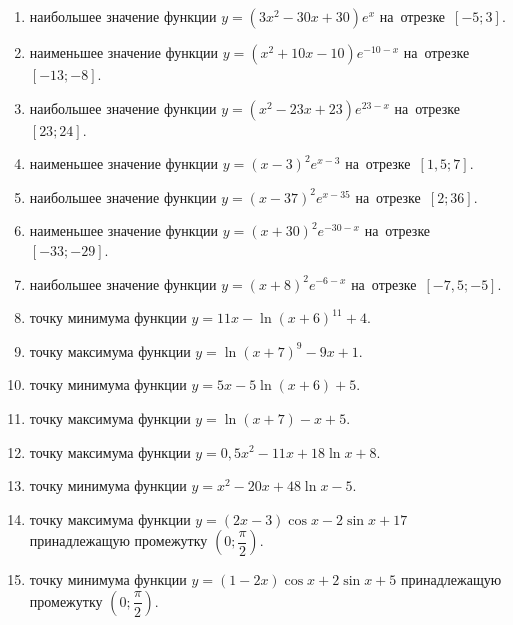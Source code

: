 \documentclass[a4paper,10pt]{article}
\begin{document}
\begin{enumerate}
\item {} наибольшее значение функции $y=\left(3x^2 -30x +30\right)e^{x}$ на~отрезке~$\left[-5;3\right]$.

\item {} наименьшее значение функции $y=\left(x^2 +10x -10\right)e^{-10-x}$ на~отрезке~$\left[-13;-8\right]$.

\item {} наибольшее значение функции $y=\left(x^2 -23x +23\right)e^{23-x}$ на~отрезке~$\left[23;24\right]$.

\item {} наименьшее значение функции $y=\left(x-3\right)^2e^{x-3}$ на~отрезке~$\left[1,5;7\right]$.

\item {} наибольшее значение функции $y=\left(x-37\right)^2e^{x-35}$ на~отрезке~$\left[2;36\right]$.

\item {} наименьшее значение функции $y=\left(x+30\right)^2e^{-30-x}$ на~отрезке~$\left[-33;-29\right]$.

\item {} наибольшее значение функции $y=\left(x+8\right)^2e^{-6-x}$ на~отрезке~$\left[-7,5;-5\right]$.

\item {} точку минимума функции $y=11x-\ln\left(x+6\right)^{11}+4$.

\item {} точку максимума функции $y=\ln\left(x+7\right)^{9}-9x+1$.

\item {} точку минимума функции $y=5x-5\ln\left(x+6\right)+5$.

\item {} точку максимума функции $y=\ln\left(x+7\right)-x+5$.

\item {} точку максимума функции $y=0,5x^2-11x+18\ln x +8$.

\item {} точку минимума функции $y=x^2-20x+48\ln x -5$.

\item {} точку максимума функции $y=\left(2x-3\right)\cos x -2\sin x+17$
принадлежащую промежутку $\left(0;\dfrac{\pi}{2}\right)$.

\item {} точку минимума функции $y=\left(1-2x\right)\cos x +2\sin x+5$
принадлежащую промежутку $\left(0;\dfrac{\pi}{2}\right)$.


\end{enumerate}
\end{document}
